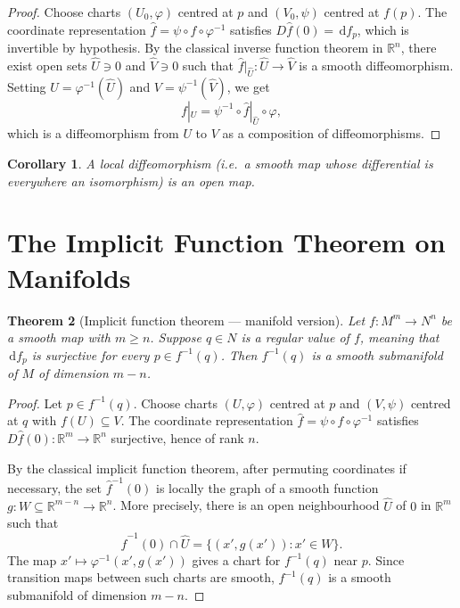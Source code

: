 \documentclass[12pt,a4paper,openany]{book}
\newtheorem{theorem}{Theorem}[section]
\newtheorem{corollary}[theorem]{Corollary}
\theoremstyle{definition}
\theoremstyle{remark}
\newcommand{\R}{\mathbb{R}}
\newcommand{\dd}{\,\mathrm{d}}
\begin{document}
\begin{proof}
Choose charts $(U_0, \varphi)$ centred at $p$ and $(V_0, \psi)$ centred at
$f(p)$.  The coordinate representation
$\hat{f} = \psi \circ f \circ \varphi^{-1}$ satisfies
$D\hat{f}(0) = \dd f_p$, which is invertible by hypothesis.  By the
classical inverse function theorem
in $\R^n$, there exist open sets $\hat{U} \ni 0$ and $\hat{V} \ni 0$ such
that $\hat{f}|_{\hat{U}} \colon \hat{U} \to \hat{V}$ is a smooth
diffeomorphism.  Setting $U = \varphi^{-1}(\hat{U})$ and
$V = \psi^{-1}(\hat{V})$, we get
\[
  f|_U = \psi^{-1} \circ \hat{f}|_{\hat{U}} \circ \varphi,
\]
which is a diffeomorphism from $U$ to $V$ as a composition of
diffeomorphisms.
\end{proof}

\begin{corollary}\label{cor:local-diffeo-open}
A local diffeomorphism (i.e.\ a smooth map whose differential is everywhere
an isomorphism) is an open map.
\end{corollary}

\section{The Implicit Function Theorem on Manifolds}
\label{sec:implicit-function-thm}

\begin{theorem}[Implicit function theorem --- manifold version]
\label{thm:implicit-function}
Let $f \colon M^m \to N^n$ be a smooth map with $m \geq n$.  Suppose
$q \in N$ is a \emph{regular value} of $f$, meaning
that $\dd f_p$ is surjective for every $p \in f^{-1}(q)$.  Then
$f^{-1}(q)$ is a smooth submanifold of $M$ of dimension $m - n$.
\end{theorem}

\begin{proof}
Let $p \in f^{-1}(q)$.  Choose charts $(U, \varphi)$ centred at $p$ and
$(V, \psi)$ centred at $q$ with $f(U) \subseteq V$.  The coordinate
representation $\hat{f} = \psi \circ f \circ \varphi^{-1}$ satisfies
$D\hat{f}(0) \colon \R^m \to \R^n$ surjective, hence of rank $n$.

By the classical implicit function theorem, after permuting coordinates if
necessary, the set $\hat{f}^{-1}(0)$ is locally the graph of a smooth
function $g \colon W \subseteq \R^{m-n} \to \R^n$.  More precisely, there
is an open neighbourhood $\hat{U}$ of $0$ in $\R^m$ such that
\[
  \hat{f}^{-1}(0) \cap \hat{U}
  = \{(x', g(x')) : x' \in W\}.
\]
The map $x' \mapsto \varphi^{-1}(x', g(x'))$ gives a chart for
$f^{-1}(q)$ near $p$.  Since transition maps between such charts are smooth,
$f^{-1}(q)$ is a smooth submanifold of dimension $m - n$.
\end{proof}
\end{document}
